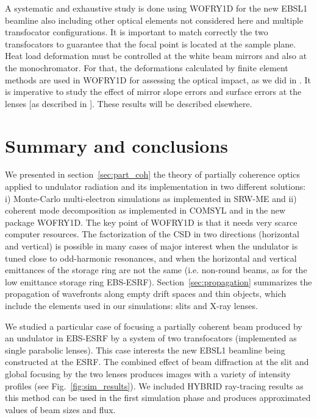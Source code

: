 \documentclass[preprint]{iucr}
\newcommand{\inred}[1]{{\color{red}#1}}
\begin{document}
A systematic and exhaustive study is done using WOFRY1D for the new EBSL1 beamline also including other optical elements not considered here and multiple transfocator configurations. It is important to match correctly the two transfocators to guarantee that the focal point is located at the sample plane. Heat load deformation must be controlled at the white beam mirrors and also at the monochromator. For that, the deformations calculated by finite element methods are used in WOFRY1D for assessing the optical impact, as we did in \cite{srioLBL}. It is \inred{imperative} to study the effect of mirror slope errors and surface errors at the lenses [as described in \cite{Celestre:mo5214}]. These results will be described elsewhere.


\section{Summary and conclusions}
\label{sec:summary}

We presented in section~\ref{sec:part_coh} the theory of partially coherence optics applied to undulator radiation and its implementation in two different solutions: i) Monte-Carlo multi-electron simulations as implemented in SRW-ME and ii) coherent mode decomposition as implemented in COMSYL and in the new package WOFRY1D.
The key point of WOFRY1D is that it needs very scarce computer resources.
The factorization of the CSD in two direction\inred{s} (horizontal and vertical) is possible in many cases of major interest when the undulator is tuned close to odd-harmonic resonances, and when the horizontal and vertical emittances of the storage ring are not the same (i.e. non-round beams, as for the low emittance storage ring  EBS-ESRF). 
Section~\ref{sec:propagation} summarizes the propagation of wavefronts along empty drift spaces and thin objects, which include the elements used in our simulations: slits and X-ray lenses. 

We studied a particular case of focusing a partial\inred{ly} coherent beam produced by an undulator in EBS-ESRF by a system of two transfocators (implemented as single parabolic lenses). This case interests the new EBSL1 beamline being constructed at the ESRF. The combined effect of beam diffraction at the slit and global focusing by the two lenses produces images with a variety of intensity profiles (see Fig.~\ref{fig:sim_results}). 
We included HYBRID ray-tracing results as this method can be used in \inred{the} first simulation phase and produces approximated values of beam sizes and flux.
\end{document}
